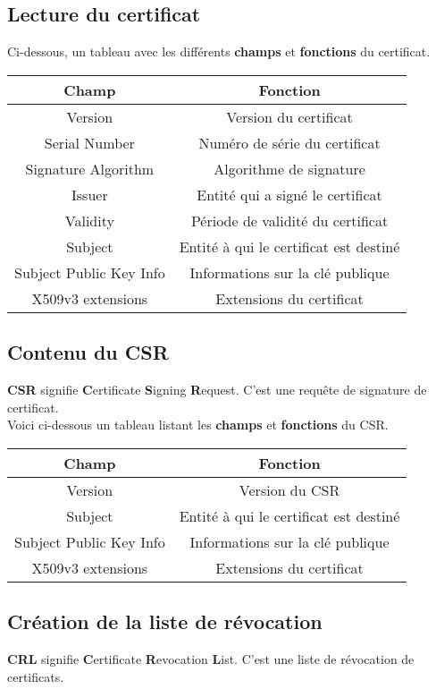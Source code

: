 \documentclass[12pt, a4paper]{article}
\begin{document}
    \subsection{Lecture du certificat}
    Ci-dessous, un tableau avec les différents \textbf{champs}
    et \textbf{fonctions} du certificat.
    \begin{center}
        \begin{tabular}{|c|c|}
            \hline
            \textbf{Champ} & \textbf{Fonction} \\
            \hline
            Version & Version du certificat \\
            \hline
            Serial Number & Numéro de série du certificat \\
            \hline
            Signature Algorithm & Algorithme de signature \\
            \hline
            Issuer & Entité qui a signé le certificat \\
            \hline
            Validity & Période de validité du certificat \\
            \hline
            Subject & Entité à qui le certificat est destiné \\
            \hline
            Subject Public Key Info & Informations sur la clé publique \\
            \hline
            X509v3 extensions & Extensions du certificat \\
            \hline
        \end{tabular}
    \end{center}

    \subsection{Contenu du CSR}
    \textbf{CSR} signifie \textbf{C}ertificate \textbf{S}igning \textbf{R}equest. C'est une requête de signature de certificat.\\
    Voici ci-dessous un tableau listant les \textbf{champs} et \textbf{fonctions} du CSR.
    \begin{center}
        \begin{tabular}{|c|c|}
            \hline
            \textbf{Champ} & \textbf{Fonction} \\
            \hline
            Version & Version du CSR \\
            \hline
            Subject & Entité à qui le certificat est destiné \\
            \hline
            Subject Public Key Info & Informations sur la clé publique \\
            \hline
            X509v3 extensions & Extensions du certificat \\
            \hline
        \end{tabular}
    \end{center}

    \subsection{Création de la liste de révocation}
    \textbf{CRL} signifie \textbf{C}ertificate \textbf{R}evocation \textbf{L}ist. C'est une liste de révocation de certificats.\\
\end{document}
